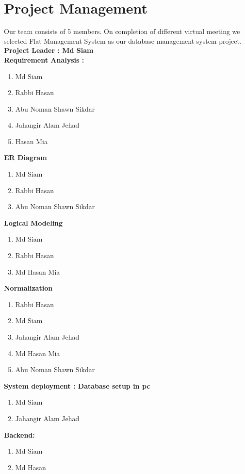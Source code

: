 \section{Project Management}\label{sec:projectmanagement}
Our team consists of 5 members. On completion of different virtual meeting we selected Flat Management System as our database  management system project.\\
\textbf{Project Leader : Md Siam}\\
\textbf{Requirement Analysis :}
\begin{enumerate}
    \item Md Siam
    \item Rabbi Hasan
    \item Abu Noman Shawn Sikdar
    \item Jahangir Alam Jehad
    \item Hasan Mia
\end{enumerate}
\textbf{ER Diagram}
\begin{enumerate}
    \item Md Siam
    \item Rabbi Hasan
    \item Abu Noman Shawn Sikdar
\end{enumerate}
\textbf{Logical Modeling}
\begin{enumerate}
    \item Md Siam
    \item Rabbi Hasan
    \item Md Hasan Mia
    
\end{enumerate}
\textbf{Normalization}
\begin{enumerate}
    \item Rabbi Hasan
    \item Md Siam
    \item Jahangir Alam Jehad
    \item Md Hasan Mia
    \item Abu Noman Shawn Sikdar
\end{enumerate}
\newpage
\noindent
\textbf{System deployment : Database setup in pc}
\begin{enumerate}
    \item Md Siam
    \item Jahangir Alam Jehad
\end{enumerate}
\textbf{Backend:}
\begin{enumerate}
    \item Md Siam
    \item Md Hasan
\end{enumerate}
